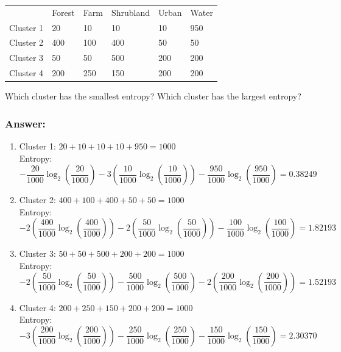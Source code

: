 \documentclass{article}
\begin{document}
\begin{table}[ht]
    \centering
    \begin{tabular}{llllll}
     & Forest & Farm & Shrubland & Urban & Water \\
    Cluster 1 & 20 & 10 & 10 & 10 & 950 \\
    Cluster 2 & 400 & 100 & 400 & 50 & 50 \\
    Cluster 3 & 50 & 50 & 500 & 200 & 200 \\
    Cluster 4 & 200 & 250 & 150 & 200 & 200
    \end{tabular}
\end{table}

Which cluster has the smallest entropy? Which cluster has the largest entropy?

\subsubsection*{Answer:}

\begin{enumerate}[label= (\alph*)]
    \item Cluster 1: $20 + 10 + 10 + 10 + 950 = 1000$
    \\
    Entropy:
    \begin{equation*}
        -\frac{20}{1000}\log_2(\frac{20}{1000}) - 3(\frac{10}{1000}\log_2(\frac{10}{1000})) - \frac{950}{1000}\log_2(\frac{950}{1000}) = 0.38249
    \end{equation*}
    \item Cluster 2: $400 + 100 + 400 + 50 + 50 = 1000$
    \\
    Entropy:
    \begin{equation*}
        -2(\frac{400}{1000}\log_2(\frac{400}{1000})) - 2(\frac{50}{1000}\log_2(\frac{50}{1000})) - \frac{100}{1000}\log_2(\frac{100}{1000}) = 1.82193
    \end{equation*}
    \item Cluster 3: $50 + 50 + 500 + 200 + 200 = 1000$
    \\
    Entropy:
    \begin{equation*}
        -2(\frac{50}{1000}\log_2(\frac{50}{1000})) - \frac{500}{1000}\log_2(\frac{500}{1000}) - 2(\frac{200}{1000}\log_2(\frac{200}{1000})) = 1.52193
    \end{equation*}
    \item Cluster 4: $200 + 250 + 150 + 200 + 200 = 1000$
    \\
    Entropy:
    \begin{equation*}
        -3(\frac{200}{1000}\log_2(\frac{200}{1000})) - \frac{250}{1000}\log_2(\frac{250}{1000}) - \frac{150}{1000}\log_2(\frac{150}{1000}) = 2.30370
    \end{equation*}
\end{enumerate}
\end{document}
